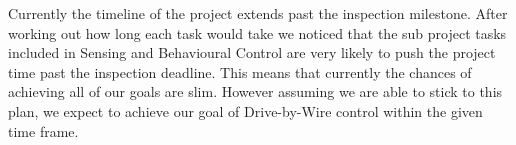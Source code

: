 Currently the timeline of the project extends past the inspection milestone.
After working out how long each task would take we noticed that the sub project
tasks included in Sensing and Behavioural Control are very likely to push the
project time past the inspection deadline. This means that currently the chances
of achieving all of our goals are slim. However assuming we are able to stick to 
this plan, we expect to achieve our goal of Drive-by-Wire control within the given
time frame.


